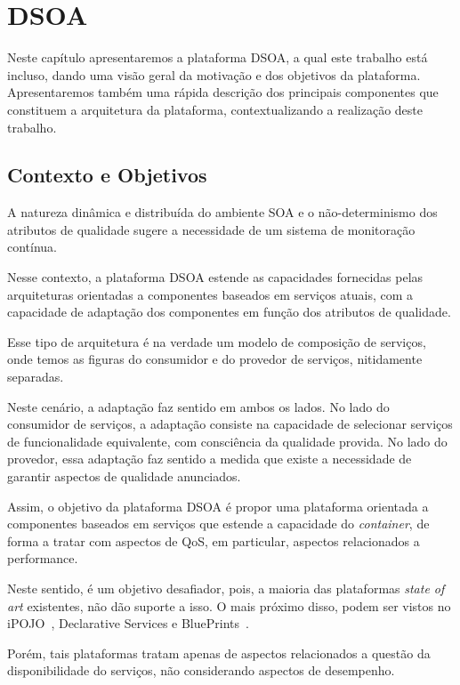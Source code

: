 \chapter{DSOA}
\label{ch:3}
Neste capítulo apresentaremos a plataforma DSOA, a qual este trabalho está incluso, dando uma visão geral da motivação e dos objetivos da plataforma. Apresentaremos também uma rápida descrição dos principais componentes que constituem a arquitetura da plataforma, contextualizando a realização deste trabalho.

\section{Contexto e Objetivos}
\label{sec:dsoa_intro}

A natureza dinâmica e distribuída do ambiente SOA e o não-determinismo dos atributos de qualidade sugere a necessidade de um sistema de monitoração contínua.

Nesse contexto, a plataforma DSOA estende as capacidades fornecidas pelas arquiteturas orientadas a componentes baseados em serviços atuais, com a capacidade de adaptação dos componentes em função dos atributos de qualidade. 

Esse tipo de arquitetura é na verdade um modelo de composição de serviços, onde temos as figuras do consumidor e do provedor de serviços, nitidamente separadas.

Neste cenário, a adaptação faz sentido em ambos os lados. No lado do consumidor de serviços, a adaptação consiste na capacidade de selecionar serviços de funcionalidade equivalente, com consciência da qualidade provida. No lado do provedor, essa adaptação faz sentido a medida que existe a necessidade de garantir aspectos de qualidade anunciados.

Assim, o objetivo da plataforma DSOA é propor uma plataforma orientada a componentes baseados em serviços que estende a capacidade do \textit{container}, de forma a tratar com aspectos de QoS, em particular, aspectos relacionados a performance.

Neste sentido, é um objetivo desafiador, pois, a maioria das plataformas \textit{state of art} existentes, não dão suporte a isso. O mais próximo disso, podem ser vistos no iPOJO~\cite{ipojo}, Declarative Services e BluePrints~\cite{blueprint}. 

Porém, tais plataformas tratam apenas de aspectos relacionados a questão da disponibilidade do serviços, não considerando aspectos de desempenho.

